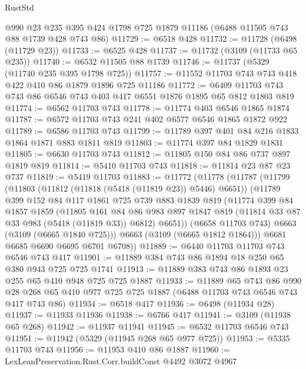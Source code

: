 \begin{lexlean}{RustStd}
\begin{coremodule}
    @990
    @23
    @235
    @395
    @424
    @1798
    @725
    @1879
    @11186
    (@6488 @11505 @743 @88 @1739 @428 @743 @86)
@11729 := @6518 @428
@11732 := @11728 (@6498 (@11729 @23))
@11733 := @6525 @428
@11737 := @11732 (@3109 (@11733 @65 @235))
@11740 := @6532 @11505 @88 @1739
@11746 := @11737 (@5329 (@11740 @235 @395 @1798 @725))
@11757 := @11552 @11703 @743 @743 @418 @422 @410 @86 @1879 @1896 @725 @11186
@11772 := @6409 @11703 @743 @743 @86 @6546 @743 @403 @417 @6551 @1876 @1895 @65 @812 @1803 @819
@11774 := @6562 @11703 @743
@11778 := @11774 @403 @6546 @1865 @1874
@11787 := @6572 @11703 @743 @241 @402 @6577 @6546 @1865 @1872 @922
@11789 := @6586 @11703 @743
@11799 := @11789 @397 @401 @84 @216 @1833 @1864 @1871 @883 @1811 @819
@11803 := @11774 @397 @84 @1829 @1831
@11805 := @6630 @11703 @743
@11812 := @11805 @150 @84 @86 @737 @897 @1819 @819
@11814 := @5410 @11703 @743
@11818 := @11814 @23 @87 @23 @737
@11819 := @5419 @11703
@11883 := @11772
    (@11778
      (@11787
        (@11799
          (@11803 (@11812 (@11818 (@5418 (@11819 @23)) @5446) @6651))
          (@11789
            @399
            @152
            @84
            @117
            @1861
            @725
            @739
            @883
            @1839
            @819
            (@11774
              @399
              @84
              @1857
              @1859
              (@11805
                @161
                @84
                @86
                @983
                @897
                @1847
                @819
                (@11814 @33 @87 @33 @983 (@5418 (@11819 @33)) @6812)
                @6651))
            (@6658 @11703 @743)
            @6663
            (@3109 (@6665 @1840 @725)))
          @6663
          (@3109 (@6665 @1812 @1864)))
        @6681
        @6685
        @6690
        @6695
        @6701
        @6708))
@11889 := @6440 @11703 @11703 @743 @6546 @743 @417
@11901 := @11889 @384 @743 @86 @1894 @18 @250 @65 @380 @943 @725 @725 @1741
@11913 := @11889 @383 @743 @86 @1893 @23 @255 @65 @410 @948 @725 @725 @1887
@11933 := @11889
    @65
    @743
    @86
    @990
    @28
    @268
    @65
    @410
    @977
    @725
    @725
    @1887
    (@6488 @11703 @743 @6546 @743 @417 @743 @86)
@11934 := @6518 @417
@11936 := @6498 (@11934 @28)
@11937 := @11933 @11936
@11938 := @6766 @417
@11941 := @3109 (@11938 @65 @268)
@11942 := @11937 @11941
@11945 := @6532 @11703 @6546 @743
@11951 := @11942 (@5329 (@11945 @268 @65 @977 @725))
@11953 := @5335 @11703 @743
@11956 := @11953 @410 @86 @1887
@11960 := LexLeanPreservation.Rust.Corr.buildConst @4492 @3072 @4967

\end{coremodule}
\end{lexlean}
